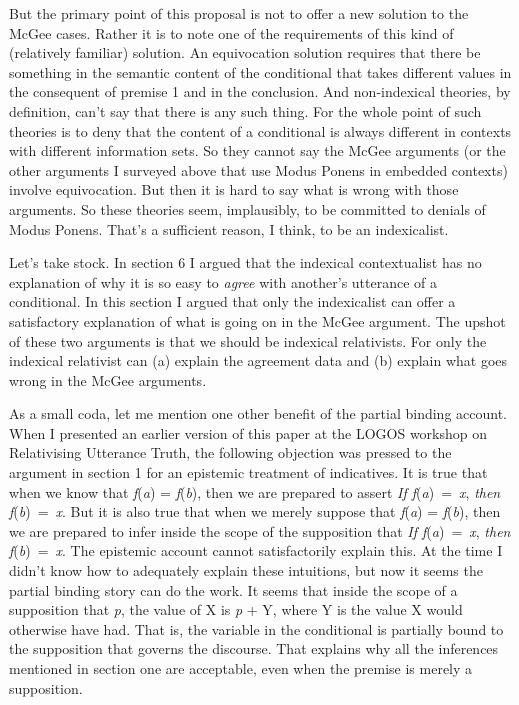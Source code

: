 But the primary point of this proposal is not to offer a new solution to the McGee cases. Rather it is to note one of the requirements of this kind of (relatively familiar) solution. An equivocation solution requires that there be something in the semantic content of the conditional that takes different values in the consequent of premise 1 and in the conclusion. And non-indexical theories, by definition, can't say that there is any such thing. For the whole point of such theories is to deny that the content of a conditional is always different in contexts with different information sets. So they cannot say the McGee arguments (or the other arguments I surveyed above that use Modus Ponens in embedded contexts) involve equivocation. But then it is hard to say what is wrong with those arguments. So these theories seem, implausibly, to be committed to denials of Modus Ponens. That's a sufficient reason, I think, to be an indexicalist.

Let's take stock. In section 6 I argued that the indexical contextualist has no explanation of why it is so easy to \textit{agree} with another's utterance of a conditional. In this section I argued that only the indexicalist can offer a satisfactory explanation of what is going on in the McGee argument. The upshot of these two arguments is that we should be indexical relativists. For only the indexical relativist can (a) explain the agreement data and (b) explain what goes wrong in the McGee arguments.

As a small coda, let me mention one other benefit of the partial binding account. When I presented an earlier version of this paper at the LOGOS workshop on Relativising Utterance Truth, the following objection was pressed to the argument in section 1 for an epistemic treatment of indicatives. It is true that when we know that \textit{f}(\textit{a}) = \textit{f}(\textit{b}), then we are prepared to assert \textit{If f}(\textit{a})~=~\textit{x}, \textit{then f}(\textit{b})~=~\textit{x}. But it is also true that when we merely suppose that \textit{f}(\textit{a}) = \textit{f}(\textit{b}), then we are prepared to infer inside the scope of the supposition that \textit{If f}(\textit{a})~=~\textit{x}, \textit{then f}(\textit{b})~=~\textit{x}. The epistemic account cannot satisfactorily explain this. At the time I didn't know how to adequately explain these intuitions, but now it seems the partial binding story can do the work. It seems that inside the scope of a supposition that \textit{p}, the value of X is \textit{p} + Y, where Y is the value X would otherwise have had. That is, the variable in the conditional is partially bound to the supposition that governs the discourse. That explains why all the inferences mentioned in section one are acceptable, even when the premise is merely a supposition. 


